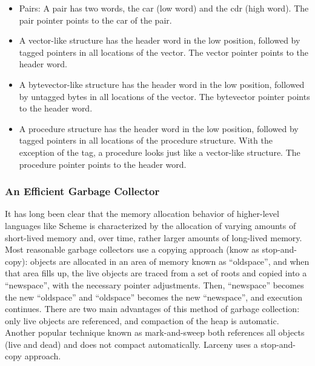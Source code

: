 \begin{itemize}
\item
Pairs: A pair has two words, the car (low word) and the cdr (high word).
The pair pointer points to the car of the pair.

\item
A vector-like structure has the header word in the low position, followed
by tagged pointers in all locations of the vector. The vector pointer
points to the header word.

\item
A bytevector-like structure has the header word in the low position,
followed by untagged bytes in all locations of the vector. The bytevector
pointer points to the header word.

\item
A procedure structure has the header word in the low position, followed by
tagged pointers in all locations of the procedure structure.  With the
exception of the tag, a procedure looks just like a vector-like structure.
The procedure pointer points to the header word.
\end{itemize}

\subsubsection{An Efficient Garbage Collector}

It has long been clear that the memory allocation behavior of
higher-level languages like Scheme is characterized by the allocation
of varying amounts of short-lived memory and, over time, rather
larger amounts of long-lived memory. Most reasonable garbage
collectors use a copying approach (know as stop-and-copy): objects are
allocated in an area of memory known as ``oldspace'', and when that
area fills up, the live objects are traced from a set of roots and
copied into a ``newspace'', with the necessary pointer adjustments.
Then, ``newspace'' becomes the new ``oldspace'' and ``oldspace''
becomes the new ``newspace'', and execution continues. There are two
main advantages of this method of garbage collection: only live
objects are referenced, and compaction of the heap is automatic.
Another popular technique known as mark-and-sweep both references all
objects (live and dead) and does not compact automatically.
Larceny uses a stop-and-copy approach.

